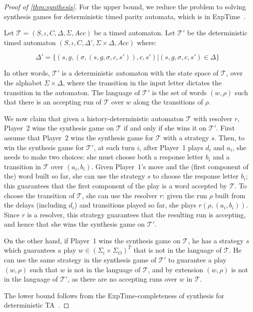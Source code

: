 \documentclass[10pt,a4paper]{amsart}
\theoremstyle{definition}
\numberwithin{equation}{section}
\newcommand{\T}{\mathcal{T}}
\newcommand{\exptime}{\EXPTIME}
\newcommand{\acc}{\mathit{Acc}}
\newcommand{\EXPTIME}{{\sc ExpTime}}
\begin{document}
\begin{proof}[Proof of \cref{thm:synthesis}]
    For the upper bound, we reduce the problem to solving synthesis games for deterministic timed parity automata, which is in \exptime~\cite{DM2002}.
 
	Let $\T=(S,\iota,C,\Delta,\Sigma,\acc)$ be a timed automaton. Let $\T'$ be the deterministic timed automaton $(S,\iota,C,\Delta',\Sigma\times \Delta, \acc)$ where:
	
	
	$$\Delta' = \{(s,g,(\sigma,(s,g,\sigma,c,s')),c,s')| (s,g,\sigma,c,s')\in \Delta\}$$
	
	In other words, $\T'$ is a deterministic automaton with the state space of $\T$, over the alphabet $\Sigma\times \Delta$, where the transition in the input letter dictates the transition in the automaton. The language of $\T'$ is the set of words $(w,\rho)$ such that there is an accepting run of $\T$ over $w$ along the transitions of $\rho$.
	
	We now claim that given a history-deterministic automaton $\T$ with resolver $r$, Player~2 wins the synthesis game on $\T$ if and only if she wins it on $\T'$.
	First assume that Player~2 wins the synthesis game for $\T$ with a strategy $s$. Then, to win the synthesis game for $\T'$, at each turn $i$, after Player~1 plays $d_i$ and $a_i$, she needs to make two choices: she must choose both a response letter $b_i$ and a transition in $\T$ over $(a_i,b_i)$. Given Player~1's move and the (first component of the) word built so far, she can use the strategy $s$ to choose the response letter $b_i$; this guarantees that the first component of the play is a word accepted by $\T$. To choose the transition of $\T$, she can use the resolver $r$: given the run $\rho$ built from the delays (including $d_i$) and transitions played so far, she plays $r(\rho,(a_i,b_i))$. Since $r$ is a resolver, this strategy guarantees that the resulting run is accepting, and hence that she wins the synthesis game on $\T'$.
	
	On the other hand, if Player~1 wins the synthesis game on $\T$, he has a strategy $s$ which guarantees a play $w\in (\Sigma_i\times \Sigma_O)^T$ that is not in the language of $\T$. He can use the same strategy in the synthesis game of $\T'$ to guarantee a play $(w,\rho)$ such that $w$ is not in the language of $\T$, and by extension $(w,\rho)$ is not in the language of $\T'$, as there are no accepting runs over $w$ in $\T$.
	
	The lower bound follows from the \exptime-completeness of synthesis for deterministic TA~\cite{DM2002}.
\end{proof}
\end{document}
